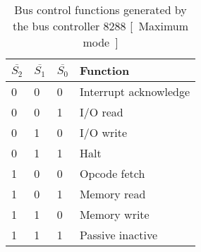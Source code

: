 \begin{table}[h!]
\centering
\begin{tabular}{ |p{1cm}|p{1cm}|p{1cm}|p{3cm}|  }
\hline
$ \overline{S_2} $ & $ \overline{S_1} $ & $ \overline{S_0} $ & Function   \\
\hline
0 & 0 & 0 & Interrupt acknowledge \\
0 & 0 & 1 & I/O read \\
0 & 1 & 0 & I/O write \\
0 & 1 & 1 & Halt \\
1 & 0 & 0 & Opcode fetch \\
1 & 0 & 1 & Memory read \\
1 & 1 & 0 & Memory write \\
1 & 1 & 1 & Passive inactive \\
\hline
\end{tabular}

\caption{Bus control functions generated by the bus controller 8288 [~Maximum mode~]}
\label{table:2}
\end{table}
